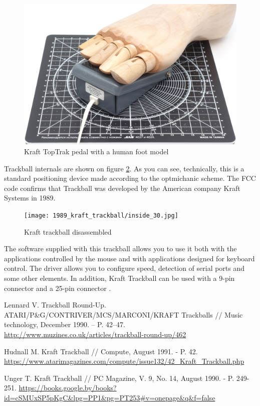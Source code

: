 \documentclass[11pt, a4paper]{article}
\begin{document}
\begin{figure}[h]
    \centering
    \includegraphics[scale=0.25]{1990_kraft_toptrack/pedal_foot_30.jpg}
    \caption{Kraft TopTrak pedal with a human foot model}
    \label{fig:TopTrakPedalFoot}
\end{figure}

Trackball internals are shown on figure \ref{fig:KraftInside}. As you can see, technically, this is a standard positioning device made according to the optmichanic scheme. The FCC code confirms that Trackball was developed by the American company Kraft Systems in 1989.

\begin{figure}[h]
    \centering
    \texttt{[image: 1989\_kraft\_trackball/inside\_30.jpg]}
    \caption{Kraft trackball disassembled}
    \label{fig:KraftInside}
\end{figure}

The software supplied with this trackball allows you to use it both with the applications controlled by the mouse and with applications designed for keyboard control. The driver allows you to configure speed, detection of serial ports and some other elements. In addition, Kraft Trackball can be used with a 9-pin connector and a 25-pin connector \cite{Hudnall}.

\begin{thebibliography}{9}
 Lennard V. Trackball Round-Up. ATARI/P\&G/CONTRIVER/MCS/MARCONI/KRAFT Trackballs // Music technology, December 1990. -- P. 42--47. \url{http://www.muzines.co.uk/articles/trackball-round-up/462}

 Hudnall M. Kraft Trackball // Compute, August 1991. - P. 42. \url{https://www.atarimagazines.com/compute/issue132/42_Kraft_Trackball.php}

 Unger T. Kraft Trackball // PC Magazine, V. 9, No. 14, August 1990. - P. 249-251. \url{https://books.google.by/books?id=cSMUxSP5pKgC&lpg=PP1&pg=PT253#v=onepage&q&f=false}
\end{thebibliography}
\end{document}
